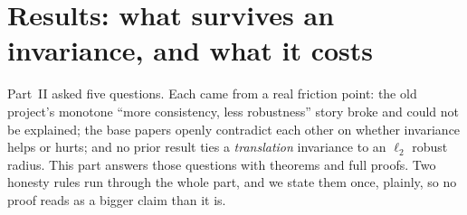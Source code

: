 %
%

\section{Results: what survives an invariance, and what it costs}
\label{sec:results}

Part~II asked five questions. Each came from a real friction point: the old project's monotone
``more consistency, less robustness'' story broke and could not be explained; the base papers
openly contradict each other on whether invariance helps or hurts; and no prior result ties a
\emph{translation} invariance to an $\ell_2$ robust radius. This part answers those questions with
theorems and full proofs. Two honesty rules run through the whole part, and we state them once,
plainly, so no proof reads as a bigger claim than it is.

